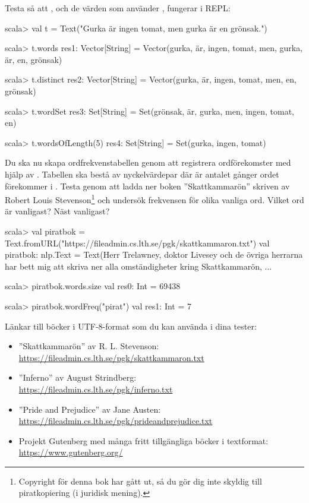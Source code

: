 \noindent Testa så att , och de värden som använder , fungerar i REPL:
\begin{REPL}
scala> val t = Text("Gurka är ingen tomat, men gurka är en grönsak.")

scala> t.words
res1: Vector[String] =
  Vector(gurka, är, ingen, tomat, men, gurka, är, en, grönsak)

scala> t.distinct
res2: Vector[String] =
  Vector(gurka, är, ingen, tomat, men, en, grönsak)

scala> t.wordSet
res3: Set[String] = Set(grönsak, är, gurka, men, ingen, tomat, en)

scala> t.wordsOfLength(5)
res4: Set[String] = Set(gurka, ingen, tomat)

\end{REPL}



\Task Du ska nu skapa ordfrekvenstabellen  genom att registrera ordförekomster med hjälp av . Tabellen  ska bestå av nyckelvärdepar  där  är antalet gånger ordet  förekommer i . Testa  genom att ladda ner boken ''Skattkammarön'' skriven av Robert Louis Stevenson\footnote{Copyright för denna bok har gått ut, så du gör dig inte skyldig till piratkopiering (i juridisk mening).} och undersök frekvensen för olika vanliga ord. Vilket ord är vanligast? Näst vanligast?

\begin{REPL}[basicstyle=\color{white}\ttfamily\fontsize{9}{11}\selectfont]
scala> val piratbok = Text.fromURL("https://fileadmin.cs.lth.se/pgk/skattkammaron.txt")
val piratbok: nlp.Text = Text(Herr Trelawney, doktor Livesey och de övriga herrarna har bett mig att skriva ner alla omständigheter kring Skattkammarön, ...

scala> piratbok.words.size
val res0: Int = 69438

scala> piratbok.wordFreq("pirat")
val res1: Int = 7
\end{REPL}
Länkar till böcker i UTF-8-format som du kan använda i dina tester:
\begin{itemize}%
\item ''Skattkammarön'' av R. L. Stevenson: \\\url{https://fileadmin.cs.lth.se/pgk/skattkammaron.txt}
\item ''Inferno'' av August Strindberg: \\\url{https://fileadmin.cs.lth.se/pgk/inferno.txt}
\item ''Pride and Prejudice'' av Jane Austen: \\\url{https://fileadmin.cs.lth.se/pgk/prideandprejudice.txt}
\item Projekt Gutenberg med många fritt tillgängliga böcker i textformat: \\\url{https://www.gutenberg.org/}
\end{itemize}






